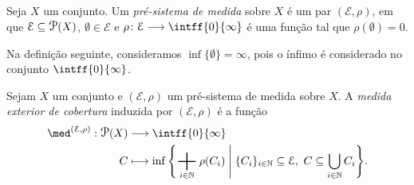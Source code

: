 
\begin{defi}
Seja $X$ um conjunto. Um \emph{pré-sistema de medida} sobre $X$ é um par $(\mathcal E, \rho)$, em que $\mathcal E \subseteq \p(X)$, $\emptyset \in \mathcal E$ e $\rho\colon \mathcal E \to \intff{0}{\infty}$ é uma função tal que $\rho(\emptyset) = 0$.
\end{defi}

Na definição seguinte, consideramos $\inf \{\emptyset\} = \infty$, pois o ínfimo é considerado no conjunto $\intff{0}{\infty}$.

\begin{defi}
Sejam $X$ um conjunto e $(\mathcal E, \rho)$ um pré-sistema de medida sobre $X$. A \emph{medida exterior de cobertura} induzida por $(\mathcal E, \rho)$ é a função
	\begin{align*}
	\func{\med^{(\mathcal E, \rho)}}{\p(X)}{\intff{0}{\infty}}{C}{
		\inf \set{\sum_{i \in \N} \rho(C_i)}{\{C_i\}_{i \in \N} \subseteq \mathcal E,\ C \subseteq \bigcup_{i \in \N} C_i}
	}.
	\end{align*}
\end{defi}

